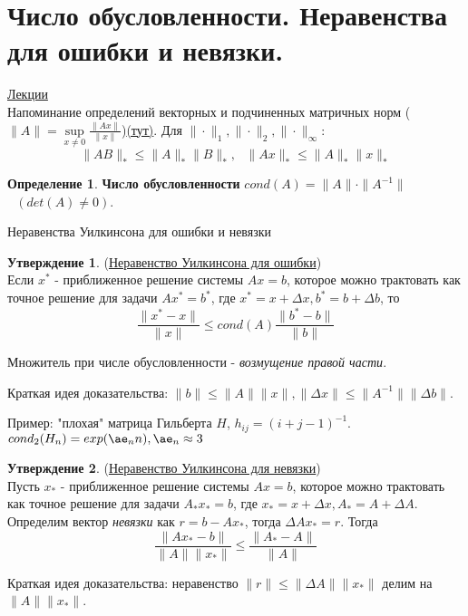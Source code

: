 \documentclass[specialist, subf, href, colorlinks=true, 12pt, times, mtpro, final]{disser}
\theoremstyle{definition}
\newtheorem{defn}{Определение}[section]
\newtheorem{state}{Утверждение}[section]
\begin{document}
{\section {Число обусловленности. Неравенства для ошибки и невязки.}
    \hyperlink {lects.56}{Лекции}\\
    Напоминание определений векторных и подчиненных матричных норм ($\|A\| = \sup \limits_{x \ne 0} \frac{\|Ax\|}{\|x\|}$)\hyperlink {lects.56}{(тут)}. Для $\|\cdot\|_1, \|\cdot\|_2, \|\cdot\|_{\infty}$:
    $$
    	\|AB\|_* \le \|A\|_*\|B\|_*, \ \ \  \|Ax\|_* \le \|A\|_*\|x\|_*
    $$
    \begin{defn}
    \textbf{Чиcло обусловленности} $cond (A) = \|A\| \cdot \|A^{-1}\|$ $ \ \ \ (det(A) \ne 0)$.
    \end{defn}
    
    \begin{center} Неравенства Уилкинсона для ошибки и невязки\end{center}

    \begin{state} (\hyperlink {lects.56}{Неравенство Уилкинсона для ошибки})\\
    Если $x^*$ - приближенное решение системы $Ax = b$, которое можно трактовать как точное решение для задачи $Ax^* = b^*$, где $x^* = x + \Delta x, b^* = b + \Delta b$, то
	$$
	\frac{\|x^* - x\|}{\|x\|} \le cond (A) \frac{\|b^*-b\|}{\|b\|}
	$$
    \end{state}
    Множитель при числе обусловленности - \emph{возмущение правой части}.

    Краткая идея доказательства: $\|b\| \le \|A\| \|x\|, \|\Delta x\| \le \|A^{-1}\|\|\Delta b\|$.

    Пример: "плохая" матрица Гильберта $H$, $h_{ij} = (i + j - 1)^{-1}$. $cond_2 (H_n) = exp(\ae_n n), \ae_n \approx 3$

    \begin{state} (\hyperlink {lects.57}{Неравенство Уилкинсона для невязки})\\
    Пусть $x_*$ - приближенное решение системы $Ax = b$, которое можно трактовать как точное решение для задачи $A_*x_* = b$, где $x_* = x + \Delta x, A_* = A + \Delta A$. Определим вектор 
    \emph{невязки} как $r = b - Ax_*$, тогда $\Delta A x_* = r$. Тогда 
	$$
	\frac{\|Ax_* - b\|}{\|A\|\|x_*\|} \le \frac{\|A_*- A\|}{\|A\|}
	$$
    \end{state}
   Краткая идея доказательства: неравенство $\|r\| \le \|\Delta A\|\|x_*\|$ делим на $\|A\|\|x_*\|$.

}
\end{document}
